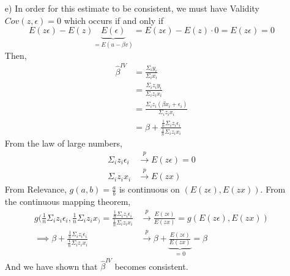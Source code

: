 \documentclass[
]{article}
\begin{document}
\begin{enumerate}
\item[e)] 
In order for this estimate to be consistent, we must have Validity $Cov(z, \epsilon) = 0$ which occurs if and only if 
\[E(z \epsilon) - E(z)\underbrace{E(\epsilon)}_{=E(u - \beta v )} = E(z\epsilon) - E(z) \cdot 0 =E(z\epsilon) = 0\] 
Then, 
\[\begin{aligned}
\hat\beta^{IV} &=  \frac{\Sigma_i y_i}{\Sigma_i x_i}  \\
&=  \frac{\Sigma_i z_i y_i}{\Sigma_i z_i x_i} \\
&= \frac{\Sigma_i z_i (\beta x_i + \epsilon_i)}{\Sigma_i z_i x_i} \\
&= \beta + \frac{\frac{1}{n}\Sigma_i z_i\epsilon_i}{\frac{1}{n}\Sigma_i z_i x_i} 
\end{aligned}\]
From the law of large numbers, 
\[\begin{aligned}
\Sigma_i z_i\epsilon_i &\stackrel{p}{\to} E(z\epsilon) = 0 \\
\Sigma_i z_i x_i &\stackrel{p}{\to} E(zx)
\end{aligned}\]
From Relevance, $g(a, b) = \frac{a}{b}$ is continuous on $(E(z\epsilon), E(zx))$. From the continuous mapping theorem, 
\[\begin{aligned}
g (\frac{1}{n}\Sigma_i z_i\epsilon_i, \frac{1}{n}\Sigma_i z_i x_) =   \frac{\frac{1}{n}\Sigma_i z_i\epsilon_i}{\frac{1}{n}\Sigma_i z_i x_i}  &\stackrel{p}{\to} \frac{E(z\epsilon)}{E(zx)} = g(E(z\epsilon), E(zx)) \\
\implies \beta + \frac{\frac{1}{n}\Sigma_i z_i\epsilon_i}{\frac{1}{n}\Sigma_i z_i x_i} &\stackrel{p}{\to} \beta + \underbrace{\frac{E(z\epsilon)}{E(zx)}}_{=0} = \beta
\end{aligned}\]
And we have shown that $\hat\beta^{IV}$ becomes consistent. 

\end{enumerate}
\end{document}
